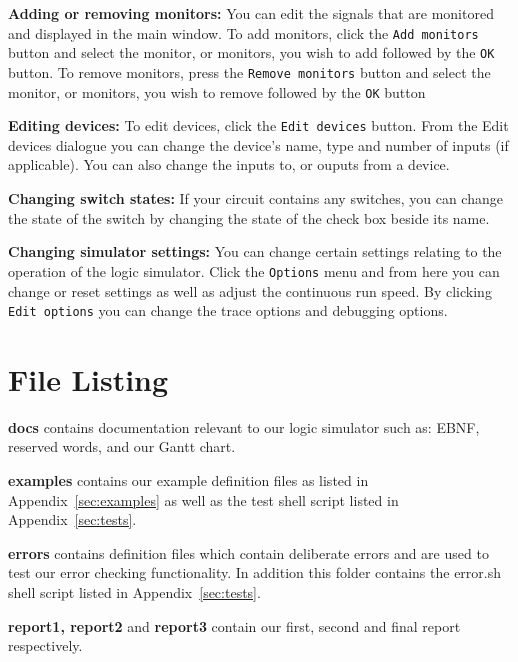 \documentclass[a4paper,10pt]{article}
\begin{document}
\textbf{Adding or removing monitors:} You can edit the signals that are monitored and displayed in the main window. To add monitors, click the \texttt{Add monitors} button and select the monitor, or monitors, you wish to add followed by the \texttt{OK} button. To remove monitors, press the \texttt{Remove monitors} button and select the monitor, or monitors, you wish to remove followed by the \texttt{OK} button

\textbf{Editing devices:} To edit devices, click the \texttt{Edit devices} button. From the Edit devices dialogue you can change the device's name, type and number of inputs (if applicable). You can also change the inputs to, or ouputs from a device.

\textbf{Changing switch states:} If your circuit contains any  switches, you can change the state of the switch by changing the state of the check box beside its name.

\textbf{Changing simulator settings:} You can change certain settings relating to the operation of the logic simulator. Click the \texttt{Options} menu and from here you can change or reset settings as well as adjust the continuous run speed. By clicking \texttt{Edit options} you can change the trace options and debugging options.


\pagebreak

\section{File Listing}
\setlength{\DTbaselineskip}{15pt}
\DTsetlength{.2em}{3em}{0.1em}{1pt}{4pt}

\textbf{docs} contains documentation relevant to our logic simulator such as: EBNF, reserved words, and our Gantt chart.

\textbf{examples} contains our example definition files as listed in Appendix~\ref{sec:examples} as well as the test shell script listed in Appendix~\ref{sec:tests}.

\textbf{errors} contains definition files which contain deliberate errors and are used to test our error checking functionality. In addition this folder contains the error.sh shell script listed in Appendix~\ref{sec:tests}.

\textbf{report1, report2} and \textbf{report3} contain our first, second and final report respectively.
\end{document}
